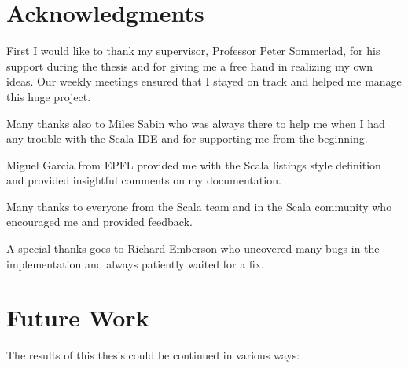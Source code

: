 \documentclass[10pt,a4paper,oneside]{scrreprt}
\begin{document}
\section{Acknowledgments}

First I would like to thank my supervisor, Professor Peter Sommerlad, for his support during the thesis and for giving me a free hand in realizing my own ideas. Our weekly meetings ensured that I stayed on track and helped me manage this huge project.

Many thanks also to Miles Sabin who was always there to help me when I had any trouble with the Scala IDE and for supporting me from the beginning. 

Miguel Garcia from EPFL provided me with the Scala listings style definition and provided insightful comments on my documentation.

Many thanks to everyone from the Scala team and in the Scala community who encouraged me and provided feedback. 

A special thanks goes to Richard Emberson who uncovered many bugs in the implementation and always patiently waited for a fix.

\section{Future Work}

The results of this thesis could be continued in various ways:
\end{document}
